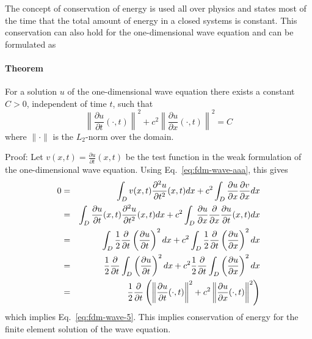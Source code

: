 The concept of conservation of energy is used all over physics and states most of the time that the total
amount of energy in a closed systems is constant. This conservation can also hold for the one-dimensional
wave equation and can be formulated as

\paragraph{Theorem} For a solution $u$ of the one-dimensional
wave equation there exists a constant $C>0$, independent of time $t$, such that
\begin{equation}
\left\|  \frac{\partial u}{\partial t} (\cdot, t)  \right\|^2 + 
c^2 \left\|  \frac{\partial u}{\partial x} (\cdot, t)  \right\|^2 =C \label{eq:fdm-wave-5}
\end{equation}
where $\| \cdot \|$ is the $L_2$-norm over the domain. 

\vspace{.5cm}

Proof: Let $v(x,t)=\frac{\partial u}{\partial t}(x,t)$ be the test function in the weak formulation of the one-dimensional wave equation. Using Eq.~\eqref{eq:fdm-wave-aaa}, this gives
\begin{eqnarray}
0 
&=& \int_D v(x,t) \frac{\partial^2 u}{\partial t^2}(x,t) dx + c^2 \int_D  \frac{\partial u}{\partial x}  \frac{\partial v}{\partial x} dx \nonumber\\
&=& \int_D \frac{\partial u}{\partial t}(x,t) \frac{\partial^2 u}{\partial t^2}(x,t) dx + c^2 \int_D  \frac{\partial u}{\partial x}  \frac{\partial }{\partial x} \frac{\partial u}{\partial t}(x,t) dx \nonumber\\
&=& \int_D \frac12 \frac{\partial}{\partial t} \left(\frac{\partial u}{\partial t} \right)^2 dx + c^2
\int_D  \frac12 \frac{\partial}{\partial t} \left( \frac{\partial u}{\partial x}  \right)^2  dx \nonumber\\
&=& \frac12 \frac{\partial}{\partial t} \int_D  \left(\frac{\partial u}{\partial t} \right)^2 dx + c^2
\frac12 \frac{\partial}{\partial t} \int_D   \left( \frac{\partial u}{\partial x}  \right)^2  dx \nonumber\\
&=& \frac12 \frac{\partial}{\partial t} 
\left(
\left\|  \frac{\partial u}{\partial t} (\cdot, t)  \right\|^2 + 
c^2 \left\|  \frac{\partial u}{\partial x} (\cdot, t)  \right\|^2
\right)
\end{eqnarray}
which implies Eq.~\eqref{eq:fdm-wave-5}.
This implies conservation of energy for the finite element solution of the wave equation.

